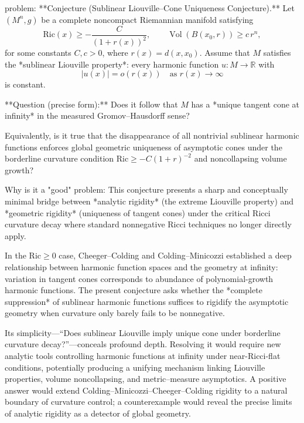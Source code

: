 problem:  
**Conjecture (Sublinear Liouville–Cone Uniqueness Conjecture).**  
Let \( (M^n,g) \) be a complete noncompact Riemannian manifold satisfying  
\[
\mathrm{Ric}(x) \ge -\frac{C}{(1+r(x))^2}, \qquad 
\operatorname{Vol}(B(x_0,r)) \ge c\, r^n,
\]
for some constants \(C,c>0\), where \(r(x) = d(x,x_0)\).  
Assume that \(M\) satisfies the *sublinear Liouville property*: every harmonic function \(u\colon M\to\mathbb{R}\) with 
\[
|u(x)| = o(r(x)) \quad \text{as } r(x)\to\infty
\]
is constant.  

**Question (precise form):**  
Does it follow that \(M\) has a *unique tangent cone at infinity* in the measured Gromov–Hausdorff sense?  

Equivalently, is it true that the disappearance of all nontrivial sublinear harmonic functions enforces global geometric uniqueness of asymptotic cones under the borderline curvature condition \(\mathrm{Ric}\ge -C(1+r)^{-2}\) and noncollapsing volume growth?  

Why is it a "good" problem:  
This conjecture presents a sharp and conceptually minimal bridge between *analytic rigidity* (the extreme Liouville property) and *geometric rigidity* (uniqueness of tangent cones) under the critical Ricci curvature decay where standard nonnegative Ricci techniques no longer directly apply.  

In the \(\mathrm{Ric}\ge0\) case, Cheeger–Colding and Colding–Minicozzi established a deep relationship between harmonic function spaces and the geometry at infinity: variation in tangent cones corresponds to abundance of polynomial-growth harmonic functions.  The present conjecture asks whether the *complete suppression* of sublinear harmonic functions suffices to rigidify the asymptotic geometry when curvature only barely fails to be nonnegative.  

Its simplicity—“Does sublinear Liouville imply unique cone under borderline curvature decay?”—conceals profound depth.  Resolving it would require new analytic tools controlling harmonic functions at infinity under near-Ricci-flat conditions, potentially producing a unifying mechanism linking Liouville properties, volume noncollapsing, and metric–measure asymptotics.  A positive answer would extend Colding–Minicozzi–Cheeger–Colding rigidity to a natural boundary of curvature control; a counterexample would reveal the precise limits of analytic rigidity as a detector of global geometry.